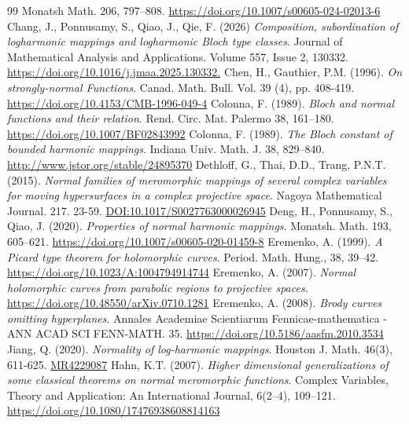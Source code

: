 \documentclass[11pt, reqno]{amsart}
\theoremstyle{definition}
\theoremstyle{remark}
\numberwithin{equation}{section}
\begin{document}
\begin{thebibliography}{99}
Monatsh Math. 206, 797–808. \url{https://doi.org/10.1007/s00605-024-02013-6}
 \label{chang-csolmalbtc-2026} Chang, J., Ponnusamy, S., Qiao, J., Qie, F. (2026)
\textit{Composition, subordination of logharmonic mappings and logharmonic Bloch type classes}. Journal of Mathematical Analysis and Applications. Volume 557, Issue 2, 130332.
\url{https://doi.org/10.1016/j.jmaa.2025.130332.}
 \label{chen-osnf-1996} Chen, H., Gauthier, P.M. (1996). \textit{On strongly-normal Functions}. Canad. Math. Bull. Vol. 39 (4), pp. 408-419. \url{https://doi.org/10.4153/CMB-1996-049-4}
 \label{colonna-banfatr-1989} Colonna, F. (1989). \textit{Bloch and normal functions and their relation}. Rend. Circ. Mat. Palermo 38, 161–180. \url{https://doi.org/10.1007/BF02843992}
 \label{colonna-tbcobhm-1989} Colonna, F. (1989). \textit{The Bloch constant of bounded harmonic mappings}. Indiana Univ. Math. J. 38, 829–840. \url{http://www.jstor.org/stable/24895370}
 \label{dethloff-nfommoscvfmhiacps-2015} Dethloff, G., Thai, D.D., Trang, P.N.T. (2015). \textit{Normal families of meromorphic mappings of several complex variables for moving hypersurfaces in a complex projective space}. Nagoya Mathematical Journal. 217. 23-59. \url{DOI:10.1017/S0027763000026945}
 \label{deng-ponhm-2020} Deng, H., Ponnusamy, S., Qiao, J. (2020). \textit{Properties of normal harmonic mappings}. Monatsh. Math. 193, 605–621. \url{https://doi.org/10.1007/s00605-020-01459-8}
 \label{eremenko-apttfhc-1999} Eremenko, A. (1999). \textit{A Picard type theorem for holomorphic curves}. Period. Math. Hung., 38, 39–42.
\url{https://doi.org/10.1023/A:1004794914744}
 \label{eremenko-nhcfprtps-2007} Eremenko, A. (2007). \textit{Normal holomorphic curves from parabolic regions to projective spaces}. \url{https://doi.org/10.48550/arXiv.0710.1281}
 \label{eremenko-bcoh-2008} Eremenko, A. (2008). \textit{Brody curves omitting hyperplanes}. Annales Academiae Scientiarum Fennicae-mathematica - ANN ACAD SCI FENN-MATH. 35.
\url{https://doi.org/10.5186/aasfm.2010.3534}
 \label{jiang-nolm-2020} Jiang, Q. (2020). \textit{Normality of log-harmonic mappings}. Houston J. Math. 46(3), 611-625. \url{MR4229087}
 \label{hahn-hdgosctonmf-2007} Hahn, K.T. (2007). \textit{Higher dimensional generalizations of some classical theorems on normal meromorphic functions}. Complex Variables, Theory and Application: An International Journal, 6(2–4), 109–121. \url{https://doi.org/10.1080/17476938608814163}

\end{thebibliography}
\end{document}
